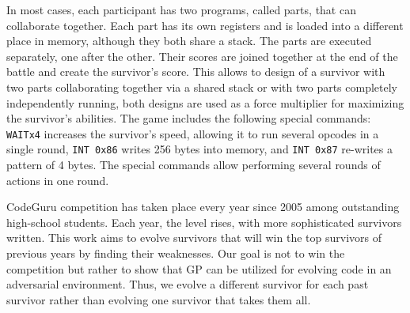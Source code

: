 \documentclass[dvipsnames, format=sigconf]{acmart}
\begin{document}
In most cases, each participant has two programs, called parts, that can collaborate together. Each part has its own registers and is loaded into a different place in memory, although they both share a stack. The parts are executed separately, one after the other. Their scores are joined together at the end of the battle and create the survivor's score. This allows to design of a survivor with two parts collaborating together via a shared stack or with two parts completely independently running, both designs are used as a force multiplier for maximizing the survivor's abilities. 
The game includes the following special commands: \texttt{WAITx4} increases the survivor's speed, allowing it to run several opcodes in a single round, \texttt{INT 0x86} writes 256 bytes into memory, and \texttt{INT 0x87} re-writes a pattern of 4 bytes. The special commands allow performing several rounds of actions in one round.  

CodeGuru competition has taken place every year since 2005 among outstanding high-school students. Each year, the level rises, with more sophisticated survivors written.
This work aims to evolve survivors that will win the top survivors of previous years by finding their weaknesses. Our goal is not to win the competition but rather to show that GP can be utilized for evolving code in an adversarial environment. Thus, we evolve a different survivor for each past survivor rather than evolving one survivor that takes them all.

\end{document}
